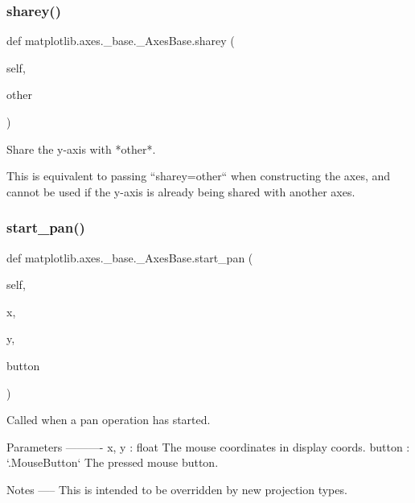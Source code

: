 \subsubsection{\texorpdfstring{sharey()}{sharey()}}
{\footnotesize\ttfamily def matplotlib.\+axes.\+\_\+base.\+\_\+\+Axes\+Base.\+sharey (\begin{DoxyParamCaption}\item[{}]{self,  }\item[{}]{other }\end{DoxyParamCaption})}

\begin{DoxyVerb}Share the y-axis with *other*.

This is equivalent to passing ``sharey=other`` when constructing the
axes, and cannot be used if the y-axis is already being shared with
another axes.
\end{DoxyVerb}
 \mbox{\label{classmatplotlib_1_1axes_1_1__base_1_1__AxesBase_afe9efa6be4449650a9ee522c58877cfd}} 
\subsubsection{\texorpdfstring{start\+\_\+pan()}{start\_pan()}}
{\footnotesize\ttfamily def matplotlib.\+axes.\+\_\+base.\+\_\+\+Axes\+Base.\+start\+\_\+pan (\begin{DoxyParamCaption}\item[{}]{self,  }\item[{}]{x,  }\item[{}]{y,  }\item[{}]{button }\end{DoxyParamCaption})}

\begin{DoxyVerb}Called when a pan operation has started.

Parameters
----------
x, y : float
    The mouse coordinates in display coords.
button : `.MouseButton`
    The pressed mouse button.

Notes
-----
This is intended to be overridden by new projection types.
\end{DoxyVerb}
 \mbox{\label{classmatplotlib_1_1axes_1_1__base_1_1__AxesBase_abd388619c905b1f2f74c361314de4480}} 
